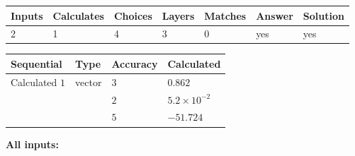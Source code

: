 \documentclass[12pt]{article}
\begin{document}
 
 
\noindent{}
 
 

 
 
\vspace{0.3in}
   
   
   
   
\noindent\begin{tabular}{|l|l|l|l|l|l|l|}
 \hline
Inputs & Calculates & Choices & Layers & Matches & Answer & Solution \\ \hline
           2  & 
           1  & 
           4
  & 
           3  & 
           0  & 
  yes & 
  yes 
  \\ \hline
 \end{tabular}
   
   
   
   
\noindent{}
   
   
  
  
\noindent\begin{tabular}{|l|l|l|l|}
\hline
 Sequential & Type & Accuracy & Calculated \\ 
\hline
 
 
  Calculated $            1 $ & vector &  
  $            3  $ 
 &  $ 0.862 $ 
 \\    
  & & 
  $            2  $ 
 &  $ 5.2 \times 10^{-2} $ 
 \\    
  & & 
  $            5  $ 
 &  $ -51.724 $ 
 \\  \hline  
 \end{tabular}
   
   
   
   
\noindent\vspace{0.1in}\hspace{-0.08in} {\textbf{\Large{All inputs: }}}
   
   
  
\end{document}
